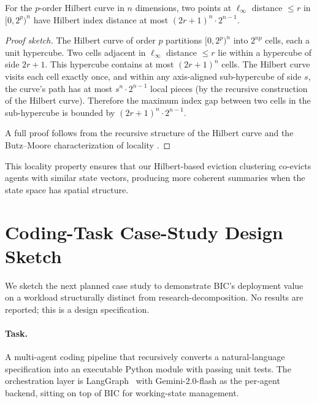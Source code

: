 \begin{lemma}
\label{lem:hilbert-locality}
For the $p$-order Hilbert curve in $n$ dimensions, two points at
$\ell_\infty$ distance $\leq r$ in $[0, 2^p)^n$ have Hilbert index
distance at most $(2r+1)^n \cdot 2^{n-1}$.
\end{lemma}

\begin{proof}[Proof sketch]
The Hilbert curve of order $p$ partitions $[0, 2^p)^n$ into $2^{np}$
cells, each a unit hypercube.  Two cells adjacent in
$\ell_\infty$ distance $\leq r$ lie within a hypercube of side
$2r+1$.  This hypercube contains at most $(2r+1)^n$ cells.  The
Hilbert curve visits each cell exactly once, and within any
axis-aligned sub-hypercube of side $s$, the curve's path has at most
$s^n \cdot 2^{n-1}$ local pieces (by the recursive
construction of the Hilbert curve).  Therefore the maximum index gap
between two cells in the sub-hypercube is bounded by
$(2r+1)^n \cdot 2^{n-1}$.

A full proof follows from the recursive structure of the Hilbert curve
and the Butz--Moore characterization of locality
\citep{butz1969hilbert, moon2001hilbert}.
\end{proof}

This locality property ensures that our Hilbert-based eviction
clustering co-evicts agents with similar state vectors, producing
more coherent summaries when the state space has spatial structure.


\section{Coding-Task Case-Study Design Sketch}
\label{app:coding-case-study}

We sketch the next planned case study to demonstrate BIC's
deployment value on a workload structurally distinct from
research-decomposition.  No results are reported; this is a design
specification.

\paragraph{Task.}
A multi-agent coding pipeline that recursively converts a natural-language
specification into an executable Python module with passing unit
tests.  The orchestration layer is LangGraph~\citep{langgraph2024}
with Gemini-2.0-flash as the per-agent backend, sitting on top of
BIC for working-state management.

